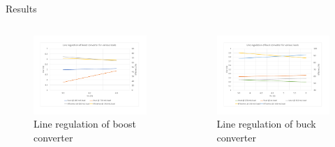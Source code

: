 \documentclass[aspectratio=169]{beamer}
\begin{document}
		\begin{frame}{Results}
			\begin{columns}[c] %
				\begin{column}{0.5\textwidth} %
					\begin{figure}
						\includegraphics[width=8cm]{Line regulation of boost.pdf}
						\caption{Line regulation of boost converter}
					\end{figure}
				\end{column}
				\begin{column}{0.5\textwidth} %
					\begin{figure}
						\includegraphics[width=8cm]{Line regulation of buck.pdf}
						\caption{Line regulation of buck converter}
					\end{figure}
					
				\end{column}
			\end{columns}	
		\end{frame}
		
\end{document}
